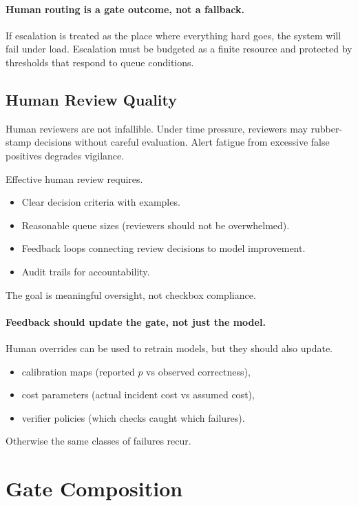 \paragraph{Human routing is a gate outcome, not a fallback.}
If escalation is treated as the place where everything hard goes, the system will fail under load. Escalation must be budgeted as a finite resource and protected by thresholds that respond to queue conditions.

\subsection{Human Review Quality}

Human reviewers are not infallible. Under time pressure, reviewers may rubber-stamp decisions without careful evaluation. Alert fatigue from excessive false positives degrades vigilance.

Effective human review requires.
\begin{itemize}
\item Clear decision criteria with examples.
\item Reasonable queue sizes (reviewers should not be overwhelmed).
\item Feedback loops connecting review decisions to model improvement.
\item Audit trails for accountability.
\end{itemize}

The goal is meaningful oversight, not checkbox compliance.

\paragraph{Feedback should update the gate, not just the model.}
Human overrides can be used to retrain models, but they should also update.
\begin{itemize}
\item calibration maps (reported $p$ vs observed correctness),
\item cost parameters (actual incident cost vs assumed cost),
\item verifier policies (which checks caught which failures).
\end{itemize}
Otherwise the same classes of failures recur.

\section{Gate Composition}

